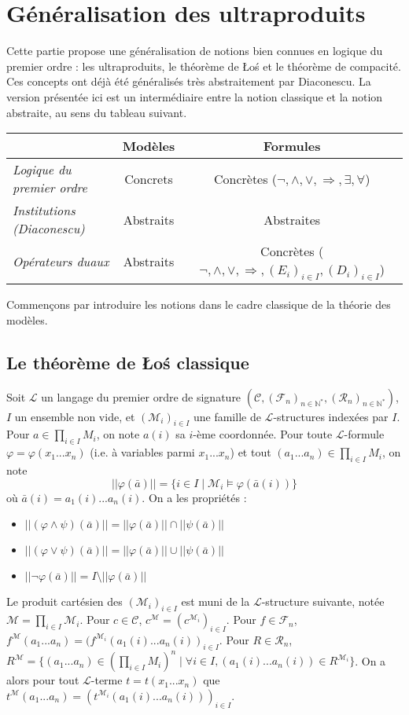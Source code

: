 \documentclass[11pt,a4paper]{article}
\newcommand{\La}{\mathcal{L}}
\newcommand{\M}{\mathcal{M}}
\newcommand{\ph}{\varphi}
\newcommand{\itemz}{\item[$\triangleright$]}
\newcommand{\F}{\mathcal{F}}
\newcommand{\gr}{\textbf}
\newcommand{\il}{\textit}
\newcommand{\N}{\mathbb{N}}
\newcommand{\R}{\mathcal{R}}
\newcommand{\C}{\mathcal{C}}
\newcommand{\1}{\mathbbm{1}}
\begin{document}
\section{Généralisation des ultraproduits}
Cette partie propose une généralisation de notions bien connues en logique du premier ordre : les ultraproduits, le théorème de \L o\'s et le théorème de compacité. Ces concepts ont déjà été généralisés très abstraitement par Diaconescu. La version présentée ici est un intermédiaire entre la notion classique et la notion abstraite, au sens du tableau suivant.
\begin{center}
\begin{tabular}{|l|c|c|}
  \hline
   & \gr{Modèles} & \gr{Formules} \\
  \hline
  \il{Logique du premier ordre} & Concrets & Concrètes ($\neg,\wedge,\vee,\Rightarrow,\exists,\forall$)\\
  \hline
  \il{Institutions (Diaconescu)} & Abstraits & Abstraites \\
  \hline
  \il{Opérateurs duaux} & Abstraits & Concrètes ($\neg,\wedge,\vee,\Rightarrow,(E_i)_{i\in I},(D_i)_{i\in I}$) \\
  \hline
\end{tabular}
\end{center}
Commençons par introduire les notions dans le cadre classique de la théorie des modèles.

\subsection{Le théorème de \L{}o\'s classique}
Soit $\La$ un langage du premier ordre de signature $(\C,(\F_n)_{n\in \N^*}, (\R_n)_{n\in \N^*})$, $I$ un ensemble non vide, et $(\M_i)_{i\in I}$ une famille de $\La$-structures indexées par $I$. Pour $a \in \prod_{i\in I} M_i$, on note $a(i)$ sa $i$-ème coordonnée. Pour toute $\La$-formule $\ph = \ph(x_1...x_n)$ (i.e. à variables parmi $x_1...x_n$) et tout $(a_1...a_n) \in \prod_{i\in I} M_i$, on note 
\[ ||\ph(\bar{a})|| = \{ i \in I \mid \M_i \models \ph(\bar{a}(i))\} \]
où $\bar{a}(i) = a_1(i)...a_n(i)$. On a les propriétés :
\begin{itemize}
\setlength\itemsep{-0.3em}
\itemz $|| (\ph \wedge \psi) (\bar{a}) || = || \ph (\bar{a}) || \cap || \psi (\bar{a}) ||$
\itemz $|| (\ph \vee \psi) (\bar{a}) || = || \ph (\bar{a}) || \cup || \psi (\bar{a}) ||$
\itemz $|| \neg\ph (\bar{a}) || = I \setminus || \ph (\bar{a}) ||$
\end{itemize}
Le produit cartésien des $(\M_i)_{i\in I}$ est muni de la $\La$-structure suivante, notée $\M = \prod_{i\in I} \M_i$. Pour $c \in \C$, $c^\M = (c^{\M_i})_{i\in I}$. Pour $f \in \F_n$, $f^\M(a_1...a_n) = (f^{\M_i}(a_1(i)...a_n(i))_{i\in I}$. Pour $R \in \R_n$, $R^\M = \{(a_1...a_n) \in (\prod_{i\in I} M_i)^n \mid \forall i \in I, (a_1(i)...a_n(i)) \in R^{\M_i}\}$. On a alors pour tout $\La$-terme $t = t(x_1...x_n)$ que $t^\M (a_1...a_n) = (t^{\M_i}(a_1(i)...a_n(i)))_{i\in I}$.
\end{document}
